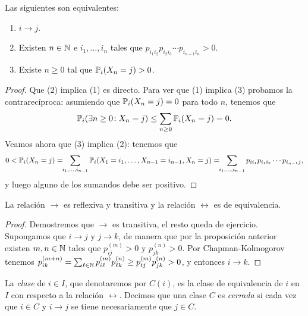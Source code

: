 \begin{prop}
Las siguientes son equivalentes:
\begin{enumerate}[label=\uptext{(\arabic*)}]
\item $i\to j$.
\item Existen $n\in\mathbb{N}$ e $i_1,\dotsc,i_n$ tales que $p_{i_1i_2}p_{i_2i_3}\dotsm p_{i_{n-1}i_n}>0$.
\item Existe $n\geq0$ tal que $\mathbb{P}_i(X_n=j)>0$.
\end{enumerate}
\end{prop}

\begin{proof}

Que (2) implica (1) es directo.
Para ver que (1) implica (3) probamos la contrarecíproca: asumiendo que $\mathbb{P}_i(X_n=j)=0$ para todo $n$, tenemos que 
\[\mathbb{P}_i(\exists n\geq0\!:X_n=j)\leq\sum_{n\geq0}\mathbb{P}_i(X_n=j)=0.\]
Veamos ahora que (3) implica (2): tenemos que
\[0<\mathbb{P}_i(X_n=j)=\!\!\sum_{i_1,\dotsc,i_{n-1}}\mathbb{P}_i(X_1=i_1,\dotsc,X_{n-1}=i_{n-1},X_n=j)=\!\!\sum_{i_1,\dotsc,i_{n-1}}p_{ii_1}p_{i_1i_2}\dotsm p_{i_{n-1}j},\]
y luego alguno de los sumandos debe ser positivo.
\end{proof}

\begin{prop}
La relación $\to$ es reflexiva y transitiva y la relación $\leftrightarrow$ es de equivalencia.
\end{prop}

\begin{proof}
Demostremos que $\to$ es transitiva, el resto queda de ejercicio.
Supongamos que $i\to j$ y $j\to k$, de manera que por la proposición anterior existen $m,n\in\mathbb{N}$ tales que $p^{(m)}_{ij}>0$ y $p^{(n)}_{jk}>0$.
Por Chapman-Kolmogorov tenemos $p^{(m+n)}_{ik}=\sum_{\ell\in\mathbb{N}}p^{(m)}_{i\ell}p^{(n)}_{\ell k}\geq p^{(m)}_{ij}p^{(n)}_{jk}>0$, y entonces $i\to k$.
\end{proof}

\begin{defn}
La \emph{clase} de $i\in I$, que denotaremos por $C(i)$, es la clase de equivalencia de $i$ en $I$ con respecto a la relación $\leftrightarrow$.
Decimos que una clase $C$ es \emph{cerrada} si cada vez que $i\in C$ y $i\to j$ se tiene necesariamente que $j\in C$.
\end{defn}

